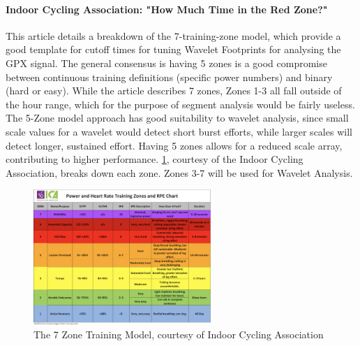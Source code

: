 \documentclass[11pt,twoside]{report}
\begin{document}
\paragraph{Indoor Cycling Association: "How Much Time in the Red Zone?"}
This article details a breakdown of the 7-training-zone model, which provide a good template for cutoff times for tuning Wavelet Footprints for analysing the GPX signal.
The general consensus is having 5 zones is a good compromise between continuous training definitions (specific power numbers) and binary (hard or easy). While the article describes 7 zones,
Zones 1-3 all fall outside of the hour range, which for the purpose of segment analysis would be fairly useless. The 5-Zone model approach
has good suitability to wavelet analysis, since small scale values for a wavelet would detect short burst efforts, while larger scales will detect longer, sustained effort.
Having 5 zones allows for a reduced scale array, contributing to higher performance. \ref{fig:7zone}, courtesy of the Indoor Cycling Association, breaks down each zone. Zones 3-7 will be used for Wavelet Analysis.
\begin{figure}[htbp!]
	\begin{center}
		\includegraphics[width=0.6\textwidth]{zones.png}
	\end{center}
	\caption{The 7 Zone Training Model, courtesy of Indoor Cycling Association}
	\label{fig:7zone}
\end{figure}
\end{document}
